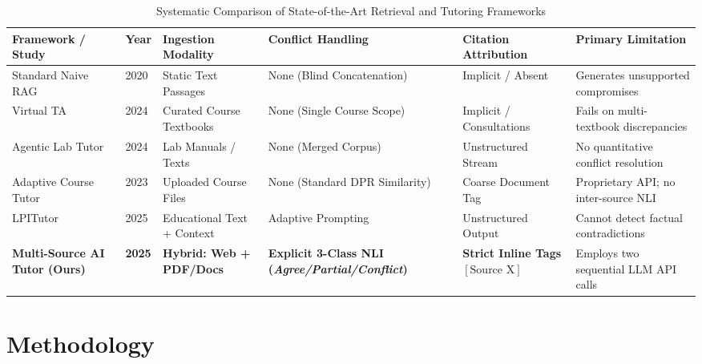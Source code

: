 \documentclass[conference]{IEEEtran}
\begin{document}
\begin{table}[t]
\caption{Systematic Comparison of State-of-the-Art Retrieval and Tutoring Frameworks}
\label{tab:lit_survey}
\centering
\small
\begin{tabular}{p{3.2cm}p{1.2cm}p{2.8cm}p{2.8cm}p{2.6cm}p{3.0cm}}
\toprule
\textbf{Framework / Study} & \textbf{Year} & \textbf{Ingestion Modality} & \textbf{Conflict Handling} & \textbf{Citation Attribution} & \textbf{Primary Limitation} \\
\midrule
Standard Naive RAG \cite{lewis2020retrieval} & 2020 & Static Text Passages & None (Blind Concatenation) & Implicit / Absent & Generates unsupported compromises \\
Virtual TA \cite{nemeth2024rag} & 2024 & Curated Course Textbooks & None (Single Course Scope) & Implicit / Consultations & Fails on multi-textbook discrepancies \\
Agentic Lab Tutor \cite{modran2024llm} & 2024 & Lab Manuals / Texts & None (Merged Corpus) & Unstructured Stream & No quantitative conflict resolution \\
Adaptive Course Tutor \cite{dong2023build} & 2023 & Uploaded Course Files & None (Standard DPR Similarity) & Coarse Document Tag & Proprietary API; no inter-source NLI \\
LPITutor \cite{liu2025lpitutor} & 2025 & Educational Text + Context & Adaptive Prompting & Unstructured Output & Cannot detect factual contradictions \\
\textbf{Multi-Source AI Tutor (Ours)} & \textbf{2025} & \textbf{Hybrid: Web + PDF/Docs} & \textbf{Explicit 3-Class NLI (\textit{Agree/Partial/Conflict})} & \textbf{Strict Inline Tags $[\text{Source X}]$} & Employs two sequential LLM API calls \\
\bottomrule
\end{tabular}
\end{table}

\section{Methodology}
\label{sec:method}
\end{document}
